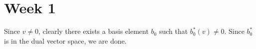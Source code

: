 \section*{Week 1}

Since $v \neq 0$, clearly there exists a basis element $b_0$ such that $b_0^{\ast}(v) \neq 0$. Since $b_0^{\ast}$ is in the dual vector space, we are done.
